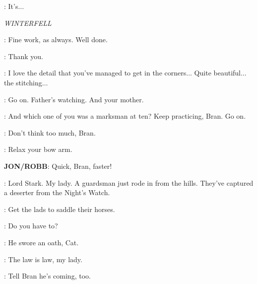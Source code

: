 \GARED: It's$\ldots$ 



\scene

\textit{WINTERFELL} 


\SEPTAMORDANE: Fine work, as always. Well done. 

\SANSA: Thank you. 

\SEPTAMORDANE: I love the detail that you've managed to get in the corners$\ldots$ Quite beautiful$\ldots$ the stitching$\ldots$ 


\JON: Go on. Father's watching. And your mother. 


\NED: And which one of you was a marksman at ten? Keep practicing, Bran. Go on. 

\JON: Don't think too much, Bran. 

\ROBB: Relax your bow arm. 


\textbf{JON/ROBB}: Quick, Bran, faster! 


\RODRIK: Lord Stark. My lady. A guardsman just rode in from the hills. They've captured a deserter from the Night's Watch. 

\NED: Get the lads to saddle their horses. 

\CATELYN: Do you have to? 

\NED: He swore an oath, Cat. 

\RODRIK: The law is law, my lady. 

\NED: Tell Bran he's coming, too. 


